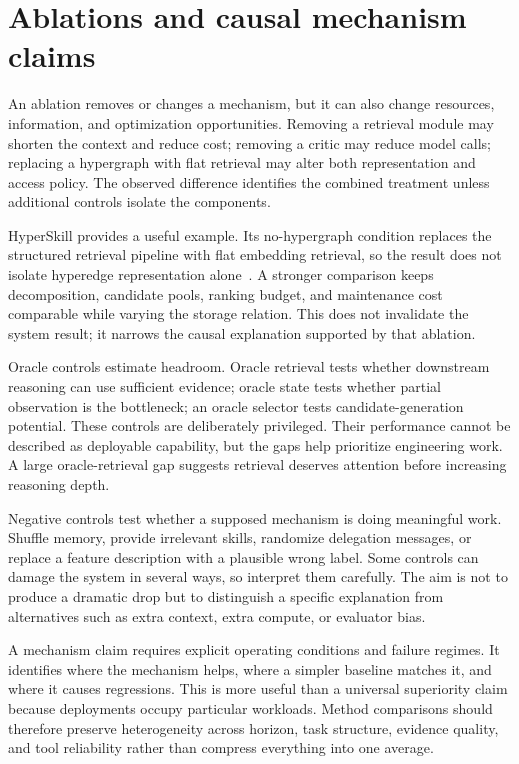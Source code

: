 \section{Ablations and causal mechanism claims}\label{sec:C26:ablations}
An ablation removes or changes a mechanism, but it can also change resources, information, and optimization opportunities. Removing a retrieval module may shorten the context and reduce cost; removing a critic may reduce model calls; replacing a hypergraph with flat retrieval may alter both representation and access policy. The observed difference identifies the combined treatment unless additional controls isolate the components.

HyperSkill provides a useful example. Its no-hypergraph condition replaces the structured retrieval pipeline with flat embedding retrieval, so the result does not isolate hyperedge representation alone~\cite{xu2026hyperskill}. A stronger comparison keeps decomposition, candidate pools, ranking budget, and maintenance cost comparable while varying the storage relation. This does not invalidate the system result; it narrows the causal explanation supported by that ablation.

Oracle controls estimate headroom. Oracle retrieval tests whether downstream reasoning can use sufficient evidence; oracle state tests whether partial observation is the bottleneck; an oracle selector tests candidate-generation potential. These controls are deliberately privileged. Their performance cannot be described as deployable capability, but the gaps help prioritize engineering work. A large oracle-retrieval gap suggests retrieval deserves attention before increasing reasoning depth.

Negative controls test whether a supposed mechanism is doing meaningful work. Shuffle memory, provide irrelevant skills, randomize delegation messages, or replace a feature description with a plausible wrong label. Some controls can damage the system in several ways, so interpret them carefully. The aim is not to produce a dramatic drop but to distinguish a specific explanation from alternatives such as extra context, extra compute, or evaluator bias.

A mechanism claim requires explicit operating conditions and failure regimes. It identifies where the mechanism helps, where a simpler baseline matches it, and where it causes regressions. This is more useful than a universal superiority claim because deployments occupy particular workloads. Method comparisons should therefore preserve heterogeneity across horizon, task structure, evidence quality, and tool reliability rather than compress everything into one average.

